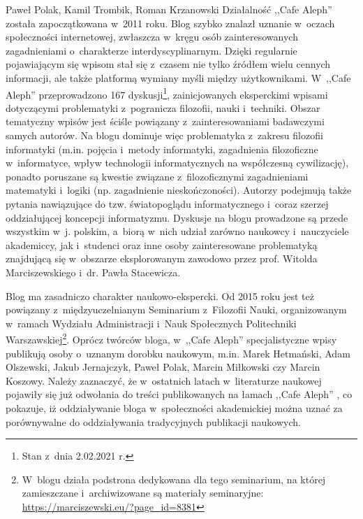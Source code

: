\begin{newrevplenv}{Paweł Polak, Kamil Trombik, Roman Krzanowski}
Działalność ,,Cafe Aleph'' została zapoczątkowana w~2011 roku. Blog szybko znalazł uznanie w~oczach społeczności internetowej, zwłaszcza w~kręgu osób zainteresowanych zagadnieniami o~charakterze interdyscyplinarnym. Dzięki regularnie pojawiającym się wpisom stał się z~czasem nie tylko źródłem wielu cennych informacji, ale także platformą wymiany myśli między użytkownikami. W~,,Cafe Aleph'' przeprowadzono 167 dyskusji\footnote{Stan z~dnia 2.02.2021 r.}, zainicjowanych eksperckimi wpisami dotyczącymi problematyki z~pogranicza filozofii, nauki i~techniki. Obszar tematyczny wpisów jest ściśle powiązany z~zainteresowaniami badawczymi samych autorów. Na blogu dominuje więc problematyka z~zakresu filozofii informatyki (m.in. pojęcia i~metody informatyki, zagadnienia filozoficzne w~informatyce, wpływ technologii informatycznych na współczesną cywilizację), ponadto poruszane są kwestie związane z~filozoficznymi zagadnieniami matematyki i~logiki (np. zagadnienie nieskończoności). Autorzy podejmują także pytania nawiązujące do tzw. światopoglądu informatycznego i~coraz szerzej oddziałującej koncepcji informatyzmu. Dyskusje na blogu prowadzone są przede wszystkim w~j. polskim, a~biorą w~nich udział zarówno naukowcy i~nauczyciele akademiccy, jak i~studenci oraz inne osoby zainteresowane problematyką znajdującą się w~obszarze eksplorowanym zawodowo przez prof. Witolda Marciszewskiego i~dr. Pawła Stacewicza.

Blog ma zasadniczo charakter naukowo-ekspercki. Od 2015 roku jest też powiązany z~międzyuczelnianym Seminarium z~Filozofii Nauki, organizowanym w~ramach Wydziału Administracji i~Nauk Społecznych Politechniki Warszawskiej\footnote{W~blogu działa podstrona dedykowana dla tego seminarium, na której zamieszczane i~archiwizowane są materiały seminaryjne: \url{https://marciszewski.eu/?page_id=8381}}. Oprócz twórców bloga, w~,,Cafe Aleph'' specjalistyczne wpisy publikują osoby o~uznanym dorobku naukowym, m.in. Marek Hetmański, Adam Olszewski, Jakub Jernajczyk, Paweł Polak, Marcin Miłkowski czy Marcin Koszowy. Należy zaznaczyć, że w~ostatnich latach w~literaturze naukowej pojawiły się już odwołania do treści publikowanych na łamach ,,Cafe Aleph''
\parencites[zob. np.][]{Sokół2014}{polak_czy_2017}{sarosiek_biologiczne_2016}, %
co pokazuje, iż oddziaływanie bloga w~społeczności akademickiej można uznać za porównywalne do oddziaływania tradycyjnych publikacji naukowych.


\end{newrevplenv}
